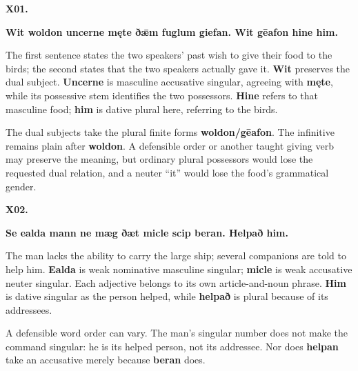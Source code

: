 \par\begin{minipage}{\linewidth}\raggedright
\textbf{X01.}

\textbf{Wit woldon uncerne męte ðǣm fuglum giefan. Wit gēafon hine him.}

The first sentence states the two speakers’ past wish to give their food to the birds; the second states that the two speakers actually gave it. \textbf{Wit} preserves the dual subject. \textbf{Uncerne} is masculine accusative singular, agreeing with \textbf{męte}, while its possessive stem identifies the two possessors. \textbf{Hine} refers to that masculine food; \textbf{him} is dative plural here, referring to the birds.

The dual subjects take the plural finite forms \textbf{woldon/\allowbreak{}gēafon}. The infinitive remains plain after \textbf{woldon}. A defensible order or another taught giving verb may preserve the meaning, but ordinary plural possessors would lose the requested dual relation, and a neuter “it” would lose the food’s grammatical gender.

\end{minipage}\par\addvspace{4pt}

\par\begin{minipage}{\linewidth}\raggedright
\textbf{X02.}

\textbf{Se ealda mann ne mæg ðæt micle scip beran. Helpað him.}

The man lacks the ability to carry the large ship; several companions are told to help him. \textbf{Ealda} is weak nominative masculine singular; \textbf{micle} is weak accusative neuter singular. Each adjective belongs to its own article-and-noun phrase. \textbf{Him} is dative singular as the person helped, while \textbf{helpað} is plural because of its addressees.

A defensible word order can vary. The man’s singular number does not make the command singular: he is its helped person, not its addressee. Nor does \textbf{helpan} take an accusative merely because \textbf{beran} does.

\end{minipage}\par\addvspace{4pt}

